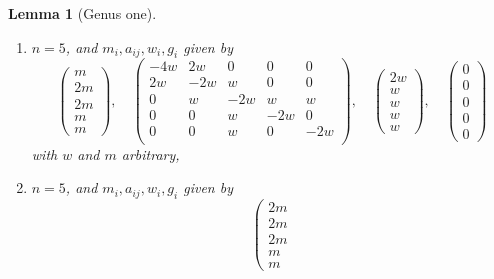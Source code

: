 \documentclass{stacks-project}
\theoremstyle{plain}
\newtheorem{lemma}[subsection]{Lemma}
\theoremstyle{definition}
\theoremstyle{remark}
\numberwithin{equation}{subsection}
\begin{document}
\begin{lemma}[Genus one]
\begin{enumerate}
$$\left(
\begin{matrix}
w \\
w \\
w \\
w \\
w
\end{matrix}
\right),
\quad
\left(
\begin{matrix}
0 \\
0 \\
0 \\
0 \\
0
\end{matrix}
\right)
$$
with $w$ and $m$ arbitrary,
\item
\label{item-triple-extended-up}
$n = 5$, and $m_i, a_{ij}, w_i, g_i$ given by
$$
\left(
\begin{matrix}
m \\
2m \\
2m \\
m \\
m
\end{matrix}
\right),
\quad
\left(
\begin{matrix}
-4w & 2w & 0 & 0 & 0 \\
2w & -2w & w & 0 & 0 \\
0 & w & -2w & w & w \\
0 & 0 & w & -2w & 0 \\
0 & 0 & w & 0 & -2w \\
\end{matrix}
\right),
\quad
\left(
\begin{matrix}
2w \\
w \\
w \\
w \\
w
\end{matrix}
\right),
\quad
\left(
\begin{matrix}
0 \\
0 \\
0 \\
0 \\
0
\end{matrix}
\right)
$$
with $w$ and $m$ arbitrary,
\item
\label{item-triple-extended-down}
$n = 5$, and $m_i, a_{ij}, w_i, g_i$ given by
$$
\left(
\begin{matrix}
2m \\
2m \\
2m \\
m \\
m
\end{matrix}
$$
\end{enumerate}
\end{lemma}
\end{document}
